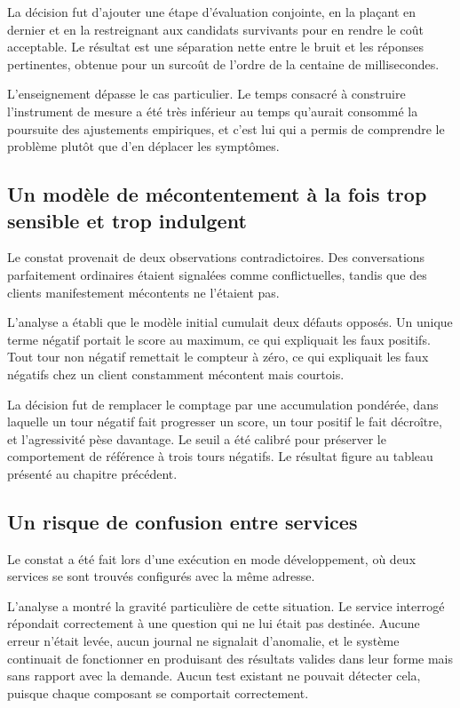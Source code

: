 La décision fut d'ajouter une étape d'évaluation conjointe, en la plaçant en dernier et en la restreignant aux candidats survivants pour en rendre le coût acceptable. Le résultat est une séparation nette entre le bruit et les réponses pertinentes, obtenue pour un surcoût de l'ordre de la centaine de millisecondes.

L'enseignement dépasse le cas particulier. Le temps consacré à construire l'instrument de mesure a été très inférieur au temps qu'aurait consommé la poursuite des ajustements empiriques, et c'est lui qui a permis de comprendre le problème plutôt que d'en déplacer les symptômes.

\subsection{Un modèle de mécontentement à la fois trop sensible et trop indulgent}

Le constat provenait de deux observations contradictoires. Des conversations parfaitement ordinaires étaient signalées comme conflictuelles, tandis que des clients manifestement mécontents ne l'étaient pas.

L'analyse a établi que le modèle initial cumulait deux défauts opposés. Un unique terme négatif portait le score au maximum, ce qui expliquait les faux positifs. Tout tour non négatif remettait le compteur à zéro, ce qui expliquait les faux négatifs chez un client constamment mécontent mais courtois.

La décision fut de remplacer le comptage par une accumulation pondérée, dans laquelle un tour négatif fait progresser un score, un tour positif le fait décroître, et l'agressivité pèse davantage. Le seuil a été calibré pour préserver le comportement de référence à trois tours négatifs. Le résultat figure au tableau présenté au chapitre précédent.

\subsection{Un risque de confusion entre services}

Le constat a été fait lors d'une exécution en mode développement, où deux services se sont trouvés configurés avec la même adresse.

L'analyse a montré la gravité particulière de cette situation. Le service interrogé répondait correctement à une question qui ne lui était pas destinée. Aucune erreur n'était levée, aucun journal ne signalait d'anomalie, et le système continuait de fonctionner en produisant des résultats valides dans leur forme mais sans rapport avec la demande. Aucun test existant ne pouvait détecter cela, puisque chaque composant se comportait correctement.

